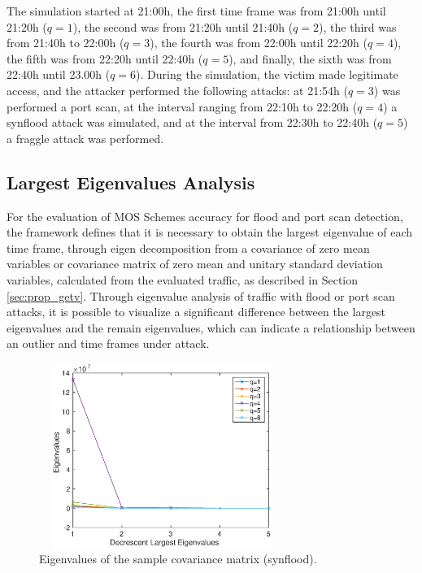 \documentclass[review]{elsarticle}
\begin{document}
The simulation started at 21:00h, the first time frame was from 21:00h until 21:20h ($q = 1$), the second was from 21:20h until 21:40h ($q = 2$), the third was from 21:40h to 22:00h ($q = 3$), the fourth was from 22:00h until 22:20h ($q = 4$), the fifth was from 22:20h until 22:40h ($q = 5$), and finally, the sixth was from 22:40h until 23.00h ($q = 6$). During the simulation, the victim made legitimate access, and the attacker performed the following attacks: at 21:54h ($q = 3$) was performed a port scan, at the interval ranging from 22:10h to 22:20h ($q = 4$) a synflood attack was simulated, and at the interval from 22:30h to 22:40h ($q = 5$) a fraggle attack was performed.

\subsection{Largest Eigenvalues Analysis}
\label{sec:largesteigenvaluesanalysis}

For the evaluation of MOS Schemes accuracy for flood and port scan detection, the framework defines that it is necessary to obtain the largest eigenvalue of each time frame, through eigen decomposition from a covariance of zero mean variables or covariance matrix of zero mean and unitary standard deviation variables, calculated from the evaluated traffic, as described in Section \ref{sec:prop_getv}. Through eigenvalue analysis of traffic with flood or port scan attacks, it is possible to visualize a significant difference between the largest eigenvalues and the remain eigenvalues, which can indicate a relationship between an outlier and time frames under attack.

\begin{figure}[h!]
	\centering
     \includegraphics[height=6cm, width=8cm]{results/figures/eigenvalues_synflood.eps} 
     \caption{Eigenvalues of the sample covariance matrix (synflood).}
     \label{fig:fig10}
\end{figure}
\end{document}

